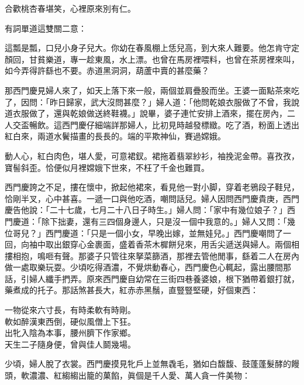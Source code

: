\begin{myquote} 
合歡桃杏春堪笑，心裡原來別有仁。
\end{myquote} 

有詞單道這雙關二意：

\begin{myquote} 
這瓢是瓢，口兒小身子兒大。你幼在春風棚上恁兒高，到大來人難要。他怎肯守定顏回，甘貧樂道，專一趁東風，水上漂。也曾在馬房裡喂料，也曾在茶房裡來叫，如今弄得許繇也不要。赤道黑洞洞，葫蘆中賣的甚麼藥？
\end{myquote} 

那西門慶見婦人來了，如天上落下來一般，兩個並肩疊股而坐。王婆一面點茶來吃了，因問：「昨日歸家，武大沒問甚麼？」婦人道：「他問乾娘衣服做了不曾，我說道衣服做了，還與乾娘做送終鞋襪。」說畢，婆子連忙安排上酒來，擺在房內，二人交盃暢飲。這西門慶仔細端詳那婦人，比初見時越發標緻。吃了酒，粉面上透出紅白來，兩道水鬢描畫的長長的。端的平欺神仙，賽過嫦娥。

\begin{myquote} 
動人心，紅白肉色，堪人愛，可意裙釵。裙拖着翡翠紗衫，袖挽泥金帶。喜孜孜，寶髻斜歪。恰便似月裡嫦娥下世來，不枉了千金也難買。

\end{myquote} 

西門慶誇之不足，摟在懷中，掀起他裙來，看見他一對小脚，穿着老鴉段子鞋兒，恰剛半叉，心中甚喜。一遞一口與他吃酒，嘲問話兒。婦人因問西門慶貴庚，西門慶告他說：「二十七歲，七月二十八日子時生。」婦人問：「家中有幾位娘子？」西門慶道：「除下拙妻，還有三四個身邊人，只是沒一個中我意的。」婦人又問：「幾位哥兒？」西門慶道：「只是一個小女，早晚出嫁，並無娃兒。」西門慶嘲問了一回，向袖中取出銀穿心金裹面，盛着香茶木樨餅兒來，用舌尖遞送與婦人。兩個相摟相抱，鳴咂有聲。那婆子只管往來拏菜篩酒，那裡去管他閒事，繇着二人在房內做一處取樂玩耍。少頃吃得酒濃，不覺烘動春心，西門慶色心輒起，露出腰間那話，引婦人纖手捫弄。原來西門慶自幼常在三街四巷養婆娘，根下猶帶着銀打就，藥煮成的托子。那話煞甚長大，紅赤赤黑鬚，直豎豎堅硬，好個東西：

\begin{myquote} 
一物從來六寸長，有時柔軟有時剛。\\軟如醉漢東西倒，硬似風僧上下狂。\\出牝入陰為本事，腰州臍下作家鄉。\\天生二子隨身便，曾與佳人鬬幾場。{}
\end{myquote} 

少頃，婦人脫了衣裳。西門慶摸見牝戶上並無毳毛，猶如白馥馥、鼓蓬蓬髮酵的饅頭，軟濃濃、紅縐縐出籠的菓餡，眞個是千人愛、萬人貪一件美物：

